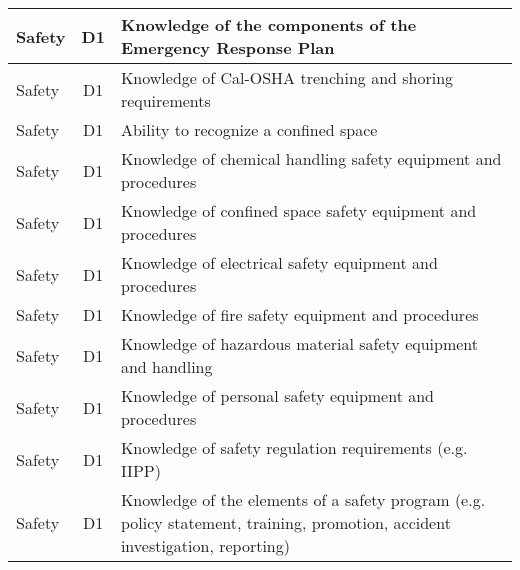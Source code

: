 \documentclass{article}
\begin{document}
\begin{table}[]
\begin{tabular}{|l|c|l|}
Safety                                 & D1             & Knowledge of the   components of the Emergency Response Plan                                                                      \\ \hline
Safety                                 & D1             & Knowledge of Cal-OSHA   trenching and shoring requirements                                                                        \\ \hline
Safety                                 & D1             & Ability to recognize   a confined space                                                                                           \\ \hline
Safety                                 & D1             & Knowledge of chemical   handling safety equipment and procedures                                                                  \\ \hline
Safety                                 & D1             & Knowledge of confined   space safety equipment and procedures                                                                     \\ \hline
Safety                                 & D1             & Knowledge of   electrical safety equipment and procedures                                                                         \\ \hline
Safety                                 & D1             & Knowledge of fire   safety equipment and procedures                                                                               \\ \hline
Safety                                 & D1             & Knowledge of   hazardous material safety equipment and handling                                                                   \\ \hline
Safety                                 & D1             & Knowledge of personal   safety equipment and procedures                                                                           \\ \hline
Safety                                 & D1             & Knowledge of safety   regulation requirements (e.g. IIPP)                                                                         \\ \hline
Safety                                 & D1             & Knowledge of the   elements of a safety program (e.g. policy statement, training, promotion,   accident investigation, reporting) \\ \hline

\end{tabular}
\end{table}
\end{document}
